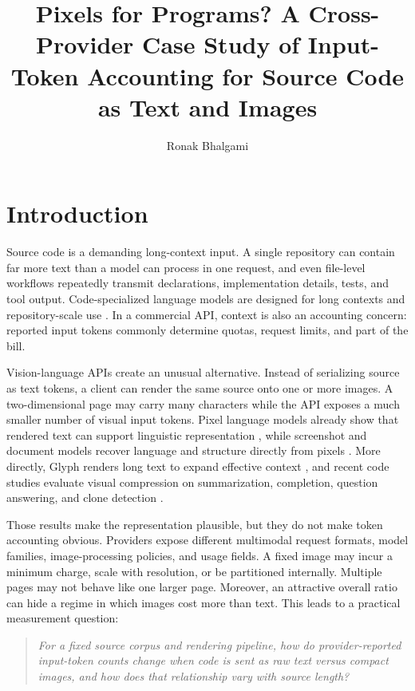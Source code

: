 \documentclass[sigconf,nonacm]{acmart}
\title{Pixels for Programs? A Cross-Provider Case Study of Input-Token Accounting for Source Code as Text and Images}
\author{Ronak Bhalgami}
\begin{document}
\maketitle
\begingroup
\renewcommand{\thefootnote}{}
\endgroup

\section{Introduction}

Source code is a demanding long-context input. A single repository can contain
far more text than a model can process in one request, and even file-level
workflows repeatedly transmit declarations, implementation details, tests, and
tool output. Code-specialized language models are designed for
long contexts and repository-scale use \cite{roziere_2023_codellama}. In a
commercial API, context is also an accounting concern: reported
input tokens commonly determine quotas, request limits, and part of the bill.

Vision-language APIs create an unusual alternative. Instead of serializing
source as text tokens, a client can render the same source onto one or more
images. A two-dimensional page may carry many characters while the API exposes
a much smaller number of visual input tokens. Pixel language models already
show that rendered text can support linguistic representation
\cite{rust_2023_pixel}, while screenshot and document models recover language
and structure directly from pixels \cite{lee_2023_pix2struct,kim_2022_donut}.
More directly, Glyph renders long text to expand effective context
\cite{cheng_2026_glyph}, and recent code studies evaluate visual compression on
summarization, completion, question answering, and clone detection
\cite{zhang_2026_codeocr,longcodeocr_2026}.

Those results make the representation plausible, but they do not make token
accounting obvious. Providers expose different multimodal request formats,
model families, image-processing policies, and usage fields. A fixed image may
incur a minimum charge, scale with resolution, or be partitioned internally.
Multiple pages may not behave like one larger page. Moreover, an attractive
overall ratio can hide a regime in which images cost more than text. This leads
to a practical measurement question:

\begin{quote}
\emph{For a fixed source corpus and rendering pipeline, how do
provider-reported input-token counts change when code is sent as raw text versus
compact images, and how does that relationship vary with source length?}
\end{quote}
\end{document}
